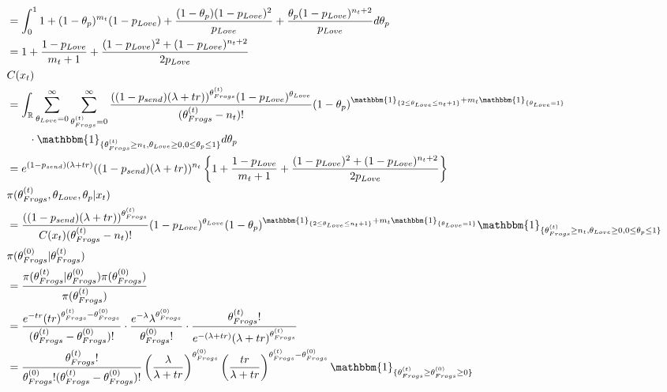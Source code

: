 \documentclass[10pt, a4paper]{article}
\begin{document}
\begin{align*}
        &= \int_0^1 1 + (1-\theta_p)^{m_t}(1-p_{Love}) + \frac{(1-\theta_p)(1-p_{Love})^2}{p_{Love}} + \frac{\theta_p(1-p_{Love})^{n_t+2}}{p_{Love}} d\theta_p \\
        &= 1 + \frac{1-p_{Love}}{m_t+1} + \frac{(1-p_{Love})^2 + (1-p_{Love})^{n_t+2}}{2p_{Love}} \\
        &C(x_t) \\
        &= \int_{\mathbb{R}}\sum_{\theta_{Love}=0}^{\infty}\sum_{\theta_{Frogs}^{(t)}=0}^{\infty}\frac{((1-p_{send})(\lambda+tr))^{\theta_{Frogs}^{(t)}}(1-p_{Love})^{\theta_{Love}}}{(\theta_{Frogs}^{(t)}-n_t)!}(1-\theta_p)^{\mathbbm{1}_{\{2\leq\theta_{Love}\leq n_t+1\}} + m_t\mathbbm{1}_{\{\theta_{Love} = 1\}}}\\&\qquad\cdot\mathbbm{1}_{\{\theta_{Frogs}^{(t)}\geq n_t, \theta_{Love}\geq 0, 0 \leq \theta_p \leq 1\}}d\theta_p \\
        &= e^{(1-p_{send})(\lambda+tr)}((1-p_{send})(\lambda+tr))^{n_t} \left\{1 + \frac{1-p_{Love}}{m_t+1} + \frac{(1-p_{Love})^2 + (1-p_{Love})^{n_t+2}}{2p_{Love}}\right\} \\
        &\pi(\theta_{Frogs}^{(t)},\theta_{Love}, \theta_p|x_t) \\
        &= \frac{((1-p_{send})(\lambda+tr))^{\theta_{Frogs}^{(t)}}}{C(x_t)(\theta_{Frogs}^{(t)}-n_t)!}(1-p_{Love})^{\theta_{Love}}(1-\theta_p)^{\mathbbm{1}_{\{2\leq\theta_{Love}\leq n_t+1\}} + m_t\mathbbm{1}_{\{\theta_{Love} = 1\}}}\mathbbm{1}_{\{\theta_{Frogs}^{(t)}\geq n_t, \theta_{Love}\geq 0, 0 \leq \theta_p \leq 1\}} \\
        &\pi(\theta_{Frogs}^{(0)}|\theta_{Frogs}^{(t)}) \\
        &= \frac{\pi(\theta_{Frogs}^{(t)}|\theta_{Frogs}^{(0)})\pi(\theta_{Frogs}^{(0)})}{\pi(\theta_{Frogs}^{(t)})} \\
        &= \frac{e^{-tr}(tr)^{\theta_{Frogs}^{(t)}-\theta_{Frogs}^{(0)}}}{(\theta_{Frogs}^{(t)}-\theta_{Frogs}^{(0)})!}\cdot \frac{e^{-\lambda}\lambda^{\theta_{Frogs}^{(0)}}}{\theta_{Frogs}^{(0)}!} \cdot \frac{\theta_{Frogs}^{(t)}!}{e^{-(\lambda+tr)}(\lambda+tr)^{\theta_{Frogs}^{(t)}}} \\
        &= \frac{\theta_{Frogs}^{(t)}!}{\theta_{Frogs}^{(0)}!(\theta_{Frogs}^{(t)}-\theta_{Frogs}^{(0)})!} \left(\frac{\lambda}{\lambda+tr}\right)^{\theta_{Frogs}^{(0)}}\left(\frac{tr}{\lambda+tr}\right)^{\theta_{Frogs}^{(t)}-\theta_{Frogs}^{(0)}} \mathbbm{1}_{\{\theta_{Frogs}^{(t)}\geq\theta_{Frogs}^{(0)}\geq0\}}\\
    \end{align*}
\end{document}

